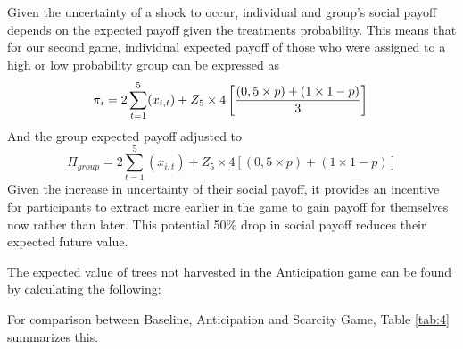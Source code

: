 Given the uncertainty of a shock to occur, individual and group's social payoff depends on the expected payoff given the treatments probability. This means that for our second game, individual expected payoff of those who were assigned to a high or low probability group can be expressed as
\begin{equation}
\label{eq:10}
    \pi_{i} = 2\sum_{t=1}^{5} (x_{i,t})+  Z_{5} \times 4 \left[ \dfrac{(0,5 \times p)+(1 \times 1-p)}{3} \right] \\
\end{equation}
And the group expected payoff adjusted to
\begin{equation}
\label{eq:11}
    \Pi_{group} = 2\sum_{t=1}^{5} (x_{i,t})+ Z_{5} \times 4 \left[ (0,5 \times p)+(1 \times 1-p) \right]
\end{equation}
Given the increase in uncertainty of their social payoff, it provides an incentive for participants to extract more earlier in the game to gain payoff for themselves now rather than later. This potential 50\% drop in social payoff reduces their expected future value.

The expected value of trees not harvested in the Anticipation game can be found by calculating the following:



For comparison between Baseline, Anticipation and Scarcity Game, Table \ref{tab:4} summarizes this.


